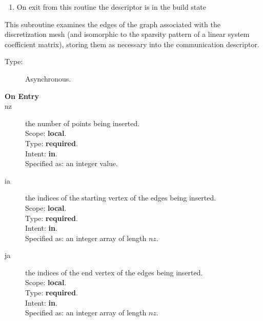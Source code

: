 \begin{enumerate}
\item On exit from this routine the descriptor is in the build state
\end{enumerate}


%
%


This subroutine examines the edges of the graph associated with the
discretization mesh (and isomorphic to the sparsity pattern of a
linear system coefficient matrix), storing them as necessary into the
communication descriptor.

\begin{description}
\item[Type:] Asynchronous.
\item[\bf On Entry]
\item[nz] the number of points being inserted.\\
Scope: {\bf local}.\\
Type: {\bf required}.\\
Intent: {\bf in}.\\
Specified as: an integer value.
\item[ia] the indices of the starting vertex of the edges  being inserted.\\
Scope: {\bf local}.\\
Type: {\bf required}.\\
Intent: {\bf in}.\\
Specified as: an integer array of length $nz$.
\item[ja]  the indices of the end vertex of the edges  being inserted.\\
Scope: {\bf local}.\\
Type: {\bf required}.\\
Intent: {\bf in}.\\
Specified as: an integer array of length $nz$.
\end{description}

